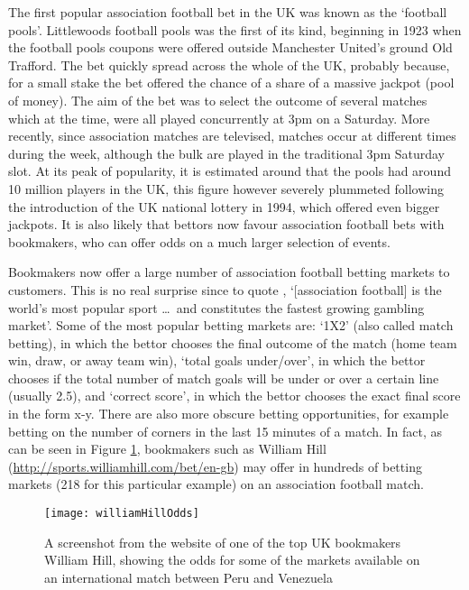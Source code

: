 The first popular association football bet in the UK was known as the `football pools'. Littlewoods football pools was
the first of its kind, beginning in 1923 when the football pools coupons were offered outside Manchester United's ground
Old Trafford. The bet quickly spread across the whole of the UK, probably because, for a small stake the bet offered the
chance of a share of a massive jackpot (pool of money). The aim of the bet was to select the outcome of several matches
which at the time, were all played concurrently at 3pm on a Saturday. More recently, since association matches are
televised, matches occur at different times during the week, although the bulk are played in the traditional 3pm
Saturday slot. At its peak of popularity, it is estimated around that the pools had around 10 million players in the UK,
this figure however severely plummeted following the introduction of the UK national lottery in 1994, which offered even
bigger jackpots. It is also likely that bettors now favour association football bets with bookmakers, who can offer odds on a
much larger selection of events.

Bookmakers now offer a large number of association football betting markets to customers. This is no real surprise since
to quote \cite{constantinou2012}, `[association football] is the world's most popular sport \ldots\ and constitutes the
fastest growing gambling market'. Some of the most popular betting markets are: `1X2' (also called match betting), in
which the bettor chooses the final outcome of the match (home team win, draw, or away team win), `total goals
under/over', in which the bettor chooses if the total number of match goals will be under or over a certain line
(usually 2.5), and `correct score', in which the bettor chooses the exact final score in the form x-y. There are also
more obscure betting opportunities, for example betting on the number of corners in the last 15 minutes of a match. In
fact, as can be seen in Figure \ref{fig:williamHillOdds}, bookmakers such as William Hill
(\url{http://sports.williamhill.com/bet/en-gb}) may offer in hundreds of betting markets (218 for this particular
example) on an association football match.
\begin{figure}[htp]
\begin{center}
  \texttt{[image: williamHillOdds]}
  \caption{\label{fig:williamHillOdds} A screenshot from the website of one of the top UK bookmakers William Hill,
  showing the odds for some of the markets available on an international match between Peru and Venezuela}
\end{center}
\end{figure}

